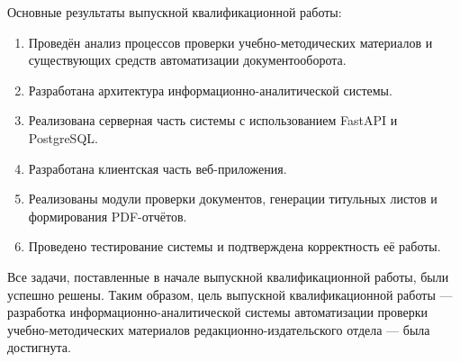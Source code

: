 Основные результаты выпускной квалификационной работы:
\begin{enumerate}
	\item Проведён анализ процессов проверки учебно-методических материалов и существующих средств автоматизации документооборота.
	
	\item Разработана архитектура информационно-аналитической системы.
	
	\item Реализована серверная часть системы с использованием FastAPI и PostgreSQL.
	
	\item Разработана клиентская часть веб-приложения.
	
	\item Реализованы модули проверки документов, генерации титульных листов и формирования PDF-отчётов.
	
	\item Проведено тестирование системы и подтверждена корректность её работы.
\end{enumerate}

Все задачи, поставленные в начале выпускной квалификационной работы, были успешно решены. Таким образом, цель выпускной квалификационной работы — разработка информационно-аналитической системы автоматизации проверки учебно-методических материалов редакционно-издательского отдела — была достигнута.